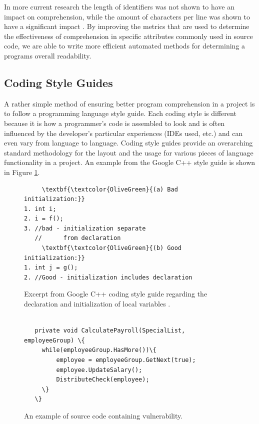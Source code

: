 In more current research the length of identifiers was not shown to have an impact on comprehension, while
the amount of characters per line was shown to have a significant impact \cite{buse_metric_2008}. By improving the metrics that are used to determine the effectiveness of comprehension in specific attributes
commonly used in source code, we are able to write more efficient automated methods for determining a
programs overall readability.  
\subsection{Coding Style Guides}
A rather simple method of ensuring better program comprehension in a project is to follow a programming
language style guide. Each coding style is different because it is how a programmer's code is assembled to
look and is often influenced by the developer’s particular experiences (IDEs used, etc.) and can even vary
from language to language. Coding style guides provide an overarching standard methodology for the layout
and the usage for various pieces of language functionality in a project. An example from the Google C++ style guide is shown in Figure \ref{fig:style}.

\begin{figure}[ht]

\begin{tcolorbox}

\scriptsize 
\begin{Verbatim}
     \textbf{\textcolor{OliveGreen}{(a) Bad initialization:}}                             
1. int i;          
2. i = f();
3. //bad - initialization separate
   //      from declaration
     \textbf{\textcolor{OliveGreen}{(b) Good initialization:}}
1. int j = g();
2. //Good - initialization includes declaration
\end{Verbatim}
\end{tcolorbox}

\caption{Excerpt from Google C++ coding style guide regarding the declaration and initialization of local variables \cite{google_google_2011}.}
\label{fig:style}
\end{figure}


\begin{figure}[!ht]
\begin{tcolorbox}

\scriptsize 
\begin{Verbatim}
   
   private void CalculatePayroll(SpecialList, employeeGroup) \{
     while(employeeGroup.HasMore())\{
         employee = employeeGroup.GetNext(true);
         employee.UpdateSalary();
         DistributeCheck(employee);
     \}
   \}    
\end{Verbatim}
\end{tcolorbox}
\caption{An example of source code containing vulnerability.
\label{fig-blind}}
\end{figure}

